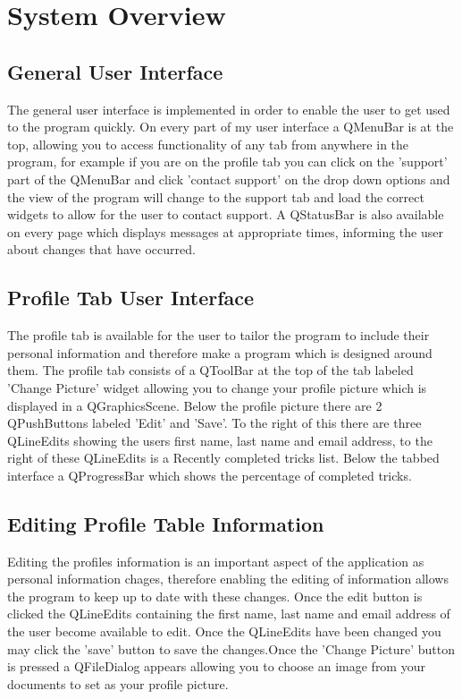 \section{System Overview}

\subsection{General User Interface}

The general user interface is implemented in order to enable the user to get used to the program quickly. On every part of my user interface a QMenuBar is at the top, allowing you to access functionality of any tab from anywhere in the program, for example if you are on the profile tab you can click on the 'support' part of the QMenuBar and click 'contact support' on the drop down options and the view of the program will change to the support tab and load the correct widgets to allow for the user to contact support. A QStatusBar is also available on every page which displays messages at appropriate times, informing the user about changes that have occurred.

\subsection{Profile Tab User Interface}

The profile tab is available for the user to tailor the program to include their personal information and therefore make a program which is designed around them. The profile tab consists of a QToolBar at the top of the tab labeled 'Change Picture' widget allowing you to change your profile picture which is displayed in a QGraphicsScene. Below the profile picture there are 2 QPushButtons labeled 'Edit' and 'Save'. To the right of this there are three QLineEdits showing the users first name, last name and email address, to the right of these QLineEdits is a Recently completed tricks list. Below the tabbed interface a QProgressBar which shows the percentage of completed tricks.

\subsection{Editing Profile Table Information}

Editing the profiles information is an important aspect of the application as personal information chages, therefore enabling the editing of information allows the program to keep up to date with these changes. Once the edit button is clicked the QLineEdits containing the first name, last name and email address of the user become available to edit. Once the QLineEdits have been changed you may click the 'save' button to save the changes.Once the 'Change Picture' button is pressed a QFileDialog appears allowing you to choose an image from your documents to set as your profile picture.



